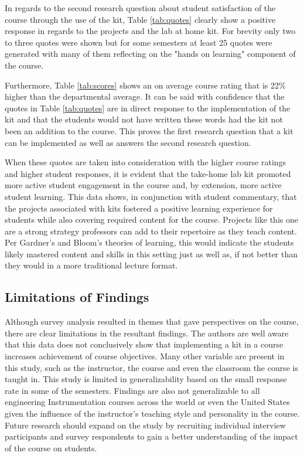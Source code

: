In regards to the second research question about student satisfaction
of the course through the use of the kit, Table \ref{tab:quotes}
clearly show a positive response in regards to the projects and the
lab at home kit. For brevity only two to three quotes were shown but
for some semesters at least 25 quotes were generated with many of them
reflecting on the "hands on learning" component of the course. 

Furthermore, Table \ref{tab:scores} shows an on average course rating
that is 22\% higher than the departmental average. It can be said with
confidence that the quotes in Table \ref{tab:quotes} are in direct
response to the implementation of the kit and that the students would
not have written these words had the kit not been an addition to the
course. This proves the first research question that a kit can be
implemented as well as answers the second research question. 

When these quotes are taken into consideration with the higher course
ratings and higher student responses, it is evident that the take-home
lab kit promoted more active student engagement in the course and, by
extension, more active student learning. This data shows, in
conjunction with student commentary, that the projects associated with
kits fostered a positive learning experience for students while also
covering required content for the course. Projects like this one are a
strong strategy professors can add to their repertoire as they teach
content. Per Gardner's and Bloom's theories of learning, this would
indicate the students likely mastered content and skills in this
setting just as well as, if not better than they would in a more
traditional lecture format\cite{Armstrong,Gardner}. 

\subsection{Limitations of Findings}

Although survey analysis resulted in themes that gave perspectives on
the course, there are clear limitations in the resultant findings. The
authors are well aware that this data does not conclusively show that
implementing a kit in a course increases achievement of course
objectives. Many other variable are present in this study, such as the
instructor, the course and even the classroom the course is taught
in. This study is limited in generalizability based on the small
response rate in some of the semesters. Findings are also not
generalizable to all engineering Instrumentation courses across the
world or even the United States given the influence of the
instructor's teaching style and personality in the course. Future
research should expand on the study by recruiting individual interview
participants and survey respondents to gain a better understanding of
the impact of the course on students.  

